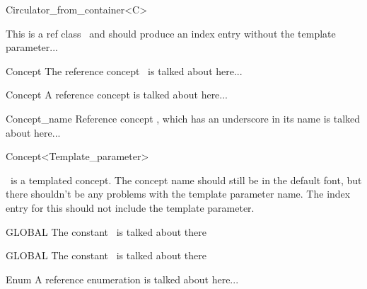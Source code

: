 
\begin{ccRefClass}{Circulator_from_container<C>}

This is a ref class \ccRefName\ and should produce an index entry 
without the template parameter...
\end{ccRefClass}

\begin{ccRefConcept}{Concept}
The reference concept \ccRefName\ is talked about here...
\end{ccRefConcept}

\begin{ccRefConcept}[Scope::]{Concept}
A reference concept is talked about here...

\ccTypes
{}

\end{ccRefConcept}

\begin{ccRefConcept}{Concept_name}
Reference concept \ccRefName, which has an underscore in its name is 
talked about here...
\end{ccRefConcept}

\begin{ccRefConcept}{Concept<Template_parameter>}

\ccRefName\ is a templated concept.  The concept name should still be in
the default font, but there shouldn't be any problems with the template
parameter name.  The index entry for this should not include the template
parameter.

\ccTypes


\ccPredicates


\end{ccRefConcept}

\begin{ccRefConstant}{GLOBAL}
The constant \ccRefName\ is talked about there
\end{ccRefConstant}

\begin{ccRefConstant}[Concept::]{GLOBAL}
The constant \ccRefScope\ccRefName\ is talked about there
\end{ccRefConstant}

\begin{ccRefEnum}[Class::]{Enum}
A reference enumeration is talked about here...
\end{ccRefEnum}

